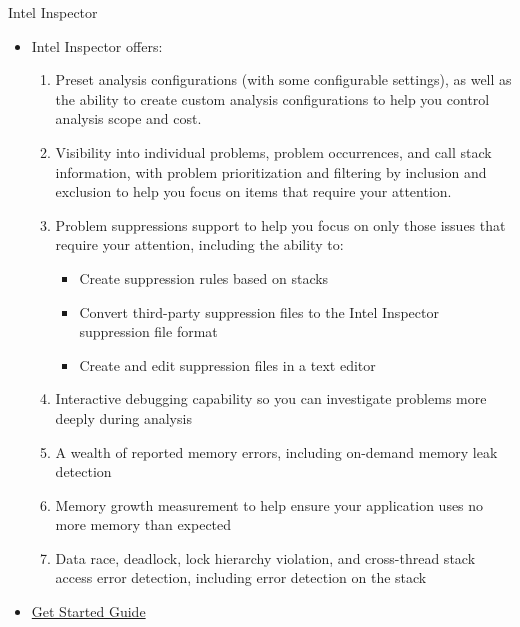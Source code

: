 \documentclass[10pt,t]{beamer}
\begin{document}
\begin{frame}{Intel Inspector}
  \begin{itemize}
  \item Intel Inspector offers:
    \begin{enumerate}
    \item Preset analysis configurations (with some configurable settings), as well as the ability to create custom analysis configurations to help you control analysis scope and cost.
    \item Visibility into individual problems, problem occurrences, and call stack information, with problem prioritization and filtering by inclusion and exclusion to help you focus on items that require your attention.
    \item Problem suppressions support to help you focus on only those issues that require your attention, including the ability to:
      \begin{itemize}
      \item Create suppression rules based on stacks
      \item Convert third-party suppression files to the Intel Inspector suppression file format
      \item Create and edit suppression files in a text editor
      \end{itemize}
    \item Interactive debugging capability so you can investigate problems more deeply during analysis
    \item A wealth of reported memory errors, including on-demand memory leak detection
    \item Memory growth measurement to help ensure your application uses no more memory than expected
    \item Data race, deadlock, lock hierarchy violation, and cross-thread stack access error detection, including error detection on the stack
    \end{enumerate}
  \item \href{https://software.intel.com/content/www/us/en/develop/documentation/get-started-with-inspector/top.html}{\color{lublue}Get Started Guide}
  \end{itemize}
\end{frame}
\end{document}
